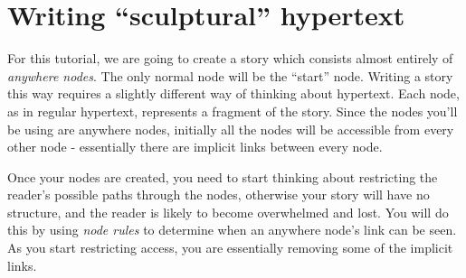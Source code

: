\documentclass{article}
\begin{document}
% 
% 
% 

\section{Writing ``sculptural'' hypertext}

For this tutorial, we are going to create a story which consists almost entirely
of \textit{anywhere nodes}. The only normal node will be the ``start'' node.
Writing a story this way requires a slightly different way of thinking about
hypertext. Each node, as in regular hypertext, represents a fragment of the
story. Since the nodes you'll be using are anywhere nodes, initially all the
nodes will be accessible from every other node - essentially there are implicit
links between every node.

Once your nodes are created, you need to start thinking about restricting the
reader's possible paths through the nodes, otherwise your story will have no
structure, and the reader is likely to become overwhelmed and lost. You will do
this by using \textit{node rules} to determine when an anywhere node's link can
be seen. As you start restricting access, you are essentially removing some of
the implicit links.
\end{document}
